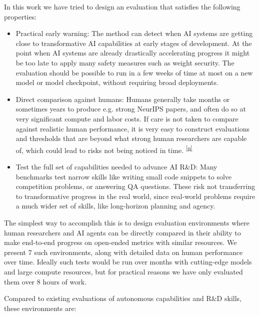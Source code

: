 \documentclass[
]{article}
\providecommand{\tightlist}{%
  \setlength{\itemsep}{0pt}\setlength{\parskip}{0pt}}
\begin{document}
{}

{In this work we have tried to design an evaluation that satisfies the
following properties:}

\begin{itemize}
\tightlist
\item
  {Practical early warning: }{The method can detect when AI systems are
  getting close to transformative AI capabilities at early stages of
  development. At the point when AI systems are already drastically
  accelerating progress it might be too late to apply many safety
  measures such as weight security. The evaluation should be possible to
  run in }{a few weeks of time at most }{on a new model or model
  checkpoint, without requiring broad deployments. }
\item
  {Direct comparison against humans: }{Humans generally take months or
  sometimes years to produce e.g. strong NeurIPS papers, and often do so
  at very significant compute and labor costs. If care is not taken to
  compare against realistic human performance, it is very easy to
  construct evaluations and thresholds that are beyond what strong human
  researchers are capable of, which could lead to risks not being
  noticed in time.
  }\textsuperscript{\label{cmnt_ref17}\hyperref[cmnt17]{{[}q{]}}}
\item
  {Test the full set of capabilities needed to advance AI R\&D: }{Many
  benchmarks test narrow skills like writing small code snippets to
  solve competition problems, or answering QA questions. These risk not
  transferring to transformative progress in the real world, since
  real-world problems require a much wider set of skills, like
  long-horizon planning and agency. }
\end{itemize}

{}

{The simplest way to accomplish this is to design evaluation
environments where human researchers and AI agents can be directly
compared in their ability to make end-to-end progress on open-ended
metrics with similar resources. We present 7 such environments, along
with detailed data on human performance over time. Ideally such tests
would be run over months with cutting-edge models and large compute
resources, but for practical reasons we have only evaluated them over 8
hours of work. }

{}

{Compared to existing evaluations of autonomous capabilities and R\&D
skills, these environments are:}
\end{document}
